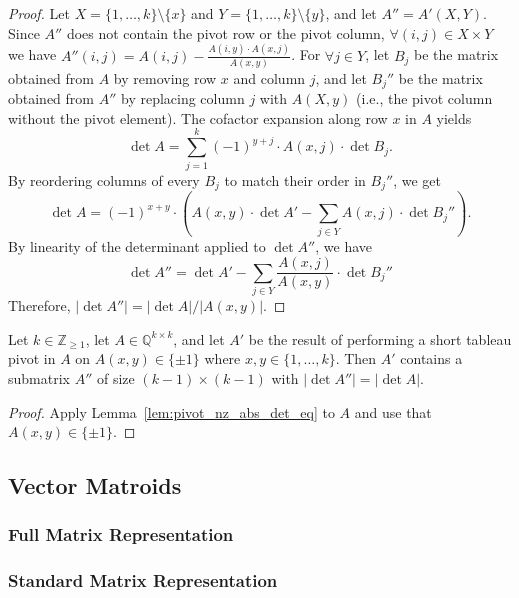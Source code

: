 \begin{proof}
    Let $X = \{1, \dots, k\} \setminus \{x\}$ and $Y = \{1, \dots, k\} \setminus \{y\}$, and let $A'' = A' (X, Y)$. Since $A''$ does not contain the pivot row or the pivot column, $\forall (i, j) \in X \times Y$ we have $A'' (i, j) = A (i, j) - \frac{A (i, y) \cdot A (x, j)}{A (x, y)}$. For $\forall j \in Y$, let $B_{j}$ be the matrix obtained from $A$ by removing row $x$ and column $j$, and let $B_{j}''$ be the matrix obtained from $A''$ by replacing column $j$ with $A (X, y)$ (i.e., the pivot column without the pivot element). The cofactor expansion along row $x$ in $A$ yields
    \[
        \det A = \sum_{j = 1}^{k} (-1)^{y + j} \cdot A (x, j) \cdot \det B_{j}.
    \]
    By reordering columns of every $B_{j}$ to match their order in $B_{j}''$, we get
    \[
        \det A = (-1)^{x + y} \cdot \left( A (x, y) \cdot \det A' - \sum_{j \in Y} A (x, j) \cdot \det B_{j}'' \right).
    \]
    By linearity of the determinant applied to $\det A''$, we have
    \[
        \det A'' = \det A' - \sum_{j \in Y} \frac{A (x, j)}{A (x, y)} \cdot \det B_{j}''
    \]
    Therefore, $|\det A''| = |\det A| / |A (x, y)|$.
\end{proof}

\begin{lemma}\label{lem:pivot_pn_abs_det_eq}
    Let $k \in \mathbb{Z}_{\geq 1}$, let $A \in \mathbb{Q}^{k \times k}$, and let $A'$ be the result of performing a short tableau pivot in $A$ on $A (x, y) \in \{\pm 1\}$ where $x, y \in \{1, \dots, k\}$. Then $A'$ contains a submatrix $A''$ of size $(k - 1) \times (k - 1)$ with $|\det A''| = |\det A|$.
\end{lemma}

\begin{proof}
    Apply Lemma~\ref{lem:pivot_nz_abs_det_eq} to $A$ and use that $A (x, y) \in \{\pm 1\}$.
\end{proof}


\subsection{Vector Matroids}

\subsubsection{Full Matrix Representation}


\subsubsection{Standard Matrix Representation}

